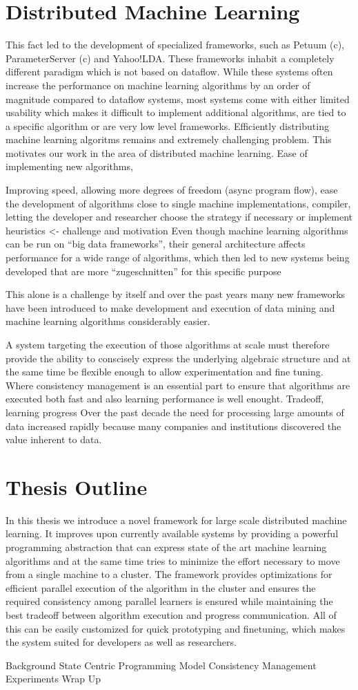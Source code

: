 \section{Distributed Machine Learning}
This fact led to the development of specialized frameworks, such as Petuum (c), ParameterServer (c) and Yahoo!LDA. These frameworks inhabit a completely different paradigm which is not based on dataflow. While these systems often increase the performance on machine learning algorithms by an order of magnitude compared to dataflow systems, most systems come with either limited usability which makes it difficult to implement additional algorithms, are tied to a specific algorithm or are very low level frameworks.
Efficiently distributing machine learning algoritms remains and extremely challenging problem. This motivates our work in the area of distributed machine learning. Ease of implementing new algorithms, 
 
Improving speed, allowing more degrees of freedom (async program flow), ease the development of algorithms close to single machine implementations, compiler, letting the developer and researcher choose the strategy if necessary or implement heuristics <- challenge and motivation
Even though machine learning algorithms can be run on “big data frameworks”, their general architecture affects performance for a wide range of algorithms, which then led to new systems being developed that are more “zugeschnitten” for this specific purpose

This alone is a challenge by itself and over the past years many new frameworks have been introduced to make development and execution of data mining and machine learning algorithms considerably easier.

A system targeting the execution of those algorithms at scale must therefore provide the ability to conscisely express the underlying algebraic structure and at the same time be flexible enough to allow experimentation and fine tuning.
Where consistency management is an essential part to ensure that algorithms are executed both fast and also learning performance is well enought. Tradeoff, learning progress 
Over the past decade the need for processing large amounts of data increased rapidly because many companies and institutions discovered the value inherent to data. 

\section{Thesis Outline}
In this thesis we introduce a novel framework for large scale distributed machine learning.
It improves upon currently available systems by providing a powerful programming abstraction that can express state of the art machine learning algorithms and at the same time tries to minimize the effort necessary to move from a single machine to a cluster.
The framework provides optimizations for efficient parallel execution of the algorithm in the cluster and ensures the required consistency among parallel learners is ensured while maintaining the best tradeoff between algorithm execution and progress communication. All of this can be easily customized for quick prototyping and finetuning, which makes the system suited for developers as well as researchers.

Background
State Centric Programming Model
Consistency Management
Experiments
Wrap Up